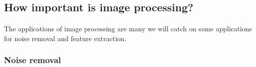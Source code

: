 \subsection{How important is image processing?}
\paragraph{}
The applications of image processing are many we will catch on some applications for noise removal and feature extraction.
\subsubsection{Noise removal}
